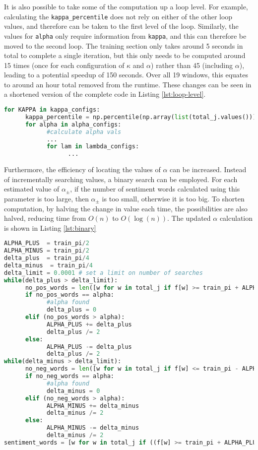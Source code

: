 \documentclass[ oneside,%
                    author={Joshua Felmeden},
                    degree={MEng},
                     title={Sentiment Analysis of Financial Headlines Based on Stock Returns},
                  subtitle={Research}]{dissertation}
\begin{document}
It is also possible to take some of the computation up a loop level. For example, calculating the \texttt{kappa\_percentile} does not rely on either of the other loop values, and therefore can be taken to the first level of the loop. Similarly, the values for \texttt{alpha} only require information from \texttt{kappa}, and this can therefore be moved to the second loop. The training section only takes around 5 seconds in total to complete a single iteration, but this only needs to be computed around 15 times (once for each configuration of $\kappa$ and $\alpha$) rather than 45 (including $\alpha$), leading to a potential speedup of 150 seconds. Over all 19 windows, this equates to around an hour total removed from the runtime. These changes can be seen in a shortened version of the complete code in Listing \ref{lst:loop-level}.

\begin{lstlisting}[float={!htb},caption={Moving computation up loop levels},label={lst:loop-level},language=Python]
for KAPPA in kappa_configs:
      kappa_percentile = np.percentile(np.array(list(total_j.values())),KAPPA) # return the nth percentile of all appearances for KAPPA
      for alpha in alpha_configs:
            #calculate alpha vals
            ...
            for lam in lambda_configs:
                  ...
\end{lstlisting}

Furthermore, the efficiency of locating the values of $\alpha$ can be increased. Instead of incrementally searching values, a binary search can be employed. For each estimated value of $\alpha_\pm$, if the number of sentiment words calculated using this parameter is too large, then $\alpha_\pm$ is too small, otherwise it is too big. To shorten computation, by halving the change in value each time, the possibilities are also halved, reducing time from $O(n)$ to $O(\log(n))$. The updated $\alpha$ calculation is shown in Listing \ref{lst:binary}
\begin{lstlisting}[float={!htb},caption={Binary search for alpha values},label={lst:binary},language=Python]
ALPHA_PLUS  = train_pi/2
ALPHA_MINUS = train_pi/2
delta_plus  = train_pi/4
delta_minus  = train_pi/4
delta_limit = 0.0001 # set a limit on number of searches
while(delta_plus > delta_limit):
      no_pos_words = len([w for w in total_j if f[w] >= train_pi + ALPHA_PLUS and total_j[w] >= kappa_percentile])
      if no_pos_words == alpha:
            #alpha found
            delta_plus = 0
      elif (no_pos_words > alpha):
            ALPHA_PLUS += delta_plus
            delta_plus /= 2
      else:
            ALPHA_PLUS -= delta_plus
            delta_plus /= 2
while(delta_minus > delta_limit):
      no_neg_words = len([w for w in total_j if f[w] <= train_pi - ALPHA_MINUS and total_j[w] >= kappa_percentile])
      if no_neg_words == alpha:
            #alpha found
            delta_minus = 0
      elif (no_neg_words > alpha):
            ALPHA_MINUS += delta_minus
            delta_minus /= 2
      else:
            ALPHA_MINUS -= delta_minus
            delta_minus /= 2
sentiment_words = [w for w in total_j if ((f[w] >= train_pi + ALPHA_PLUS or f[w] <= train_pi - ALPHA_MINUS) and total_j[w] >= kappa_percentile)]
\end{lstlisting}
\end{document}
